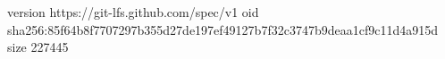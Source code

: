 version https://git-lfs.github.com/spec/v1
oid sha256:85f64b8f7707297b355d27de197ef49127b7f32c3747b9deaa1cf9c11d4a915d
size 227445
